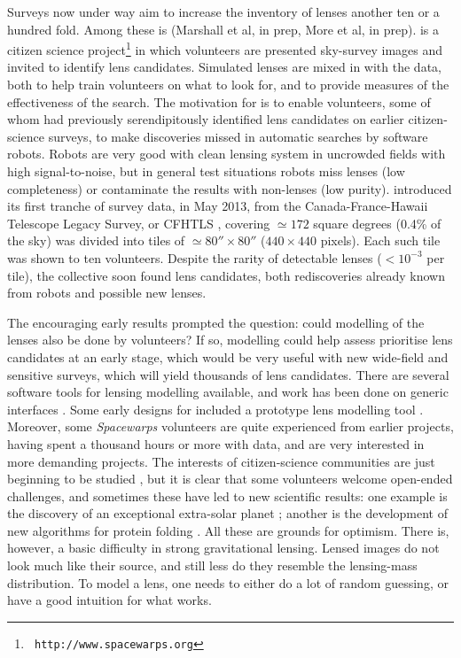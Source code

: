 Surveys now under way aim to increase the inventory of lenses another
ten or a hundred fold.  Among these is \sw (Marshall et al, in prep,
More et al, in prep).  \sw is a citizen science project\footnote{\tt
  http://www.spacewarps.org} in which volunteers are presented
sky-survey images and invited to identify lens candidates.  Simulated
lenses are mixed in with the data, both to help train volunteers on
what to look for, and to provide measures of the effectiveness of the
search.  The motivation for \sw is to enable volunteers, some of whom
had previously serendipitously identified lens candidates on earlier
citizen-science surveys, to make discoveries missed in automatic
searches by software robots.  Robots are very good with clean lensing
system in uncrowded fields with high signal-to-noise, but in general
test situations \citep{2009ApJ...694..924M} robots miss lenses (low
completeness) or contaminate the results with non-lenses (low purity).
\sw introduced its first tranche of survey data, in May 2013, from the
Canada-France-Hawaii Telescope Legacy Survey, or CFHTLS
\citep{Coupon2009}, covering $\simeq172$ square degrees (0.4\% of the
sky) was divided into tiles of $\simeq 80''\times80''$ ($440\times
440$ pixels).  Each such tile was shown to ten volunteers.  Despite
the rarity of detectable lenses ($<10^{-3}$ per tile), the \sw
collective soon found lens candidates, both rediscoveries already
known from robots \citep{Gavazzi2012, More2012ApJ} and possible new
lenses.

The encouraging early results prompted the question: could modelling
of the lenses also be done by volunteers?  If so, modelling could help
assess prioritise lens candidates at an early stage, which would be
very useful with new wide-field and sensitive surveys, which will
yield thousands of lens candidates. There are several software tools
for lensing modelling available, and work has been done on generic
interfaces \citep{2014A&C.....5...28L}.  Some early designs for \sw
included a prototype lens modelling tool \citep{2010AAS...21543527N}.
Moreover, some {\em Spacewarps\/} volunteers are quite experienced
from earlier projects, having spent a thousand hours or more with
data, and are very interested in more demanding projects.  The
interests of citizen-science communities are just beginning to be
studied \citep[e.g.,][]{2013AEdRv..12a0106J}, but it is clear that
some volunteers welcome open-ended challenges, and sometimes these
have led to new scientific results: one example is the discovery of an
exceptional extra-solar planet \citep{2013ApJ...768..127S}; another is
the development of new algorithms for protein folding
\citep{Khatib22112011}.  All these are grounds for optimism.  There
is, however, a basic difficulty in strong gravitational lensing.
Lensed images do not look much like their source, and still less do
they resemble the lensing-mass distribution.  To model a lens, one
needs to either do a lot of random guessing, or have a good intuition
for what works.

